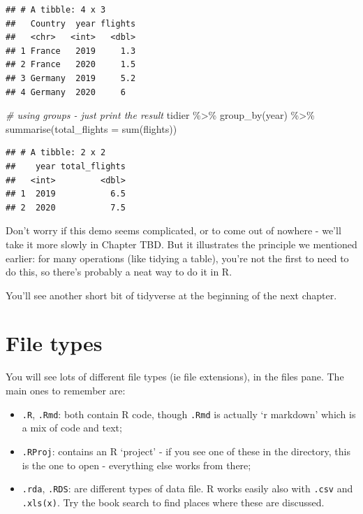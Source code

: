 \documentclass[
]{book}
\newenvironment{Shaded}{\begin{snugshade}}{\end{snugshade}}
\newcommand{\AttributeTok}[1]{\textcolor[rgb]{0.77,0.63,0.00}{#1}}
\newcommand{\CommentTok}[1]{\textcolor[rgb]{0.56,0.35,0.01}{\textit{#1}}}
\newcommand{\FunctionTok}[1]{\textcolor[rgb]{0.00,0.00,0.00}{#1}}
\newcommand{\NormalTok}[1]{#1}
\newcommand{\SpecialCharTok}[1]{\textcolor[rgb]{0.00,0.00,0.00}{#1}}
\providecommand{\tightlist}{%
  \setlength{\itemsep}{0pt}\setlength{\parskip}{0pt}}
\begin{document}
\begin{verbatim}
## # A tibble: 4 x 3
##   Country  year flights
##   <chr>   <int>   <dbl>
## 1 France   2019     1.3
## 2 France   2020     1.5
## 3 Germany  2019     5.2
## 4 Germany  2020     6
\end{verbatim}

\begin{Shaded}
\begin{Highlighting}[]
\CommentTok{\# using groups {-} just print the result}
\NormalTok{tidier }\SpecialCharTok{\%\textgreater{}\%} \FunctionTok{group\_by}\NormalTok{(year) }\SpecialCharTok{\%\textgreater{}\%} 
  \FunctionTok{summarise}\NormalTok{(}\AttributeTok{total\_flights =} \FunctionTok{sum}\NormalTok{(flights))}
\end{Highlighting}
\end{Shaded}

\begin{verbatim}
## # A tibble: 2 x 2
##    year total_flights
##   <int>         <dbl>
## 1  2019           6.5
## 2  2020           7.5
\end{verbatim}

Don't worry if this demo seems complicated, or to come out of nowhere - we'll take it more slowly in Chapter TBD. But it illustrates the principle we mentioned earlier: for many operations (like tidying a table), you're not the first to need to do this, so there's probably a neat way to do it in R.

You'll see another short bit of tidyverse at the beginning of the next chapter.

\hypertarget{filetypes}{%
\section{File types}\label{filetypes}}

You will see lots of different file types (ie file extensions), in the files pane. The main ones to remember are:

\begin{itemize}
\tightlist
\item
  \texttt{.R}, \texttt{.Rmd}: both contain R code, though \texttt{.Rmd} is actually `r markdown' which is a mix of code and text;
\item
  \texttt{.RProj}: contains an R `project' - if you see one of these in the directory, this is the one to open - everything else works from there;
\item
  \texttt{.rda}, \texttt{.RDS}: are different types of data file. R works easily also with \texttt{.csv} and \texttt{.xls(x)}. Try the book search to find places where these are discussed.
\end{itemize}
\end{document}

